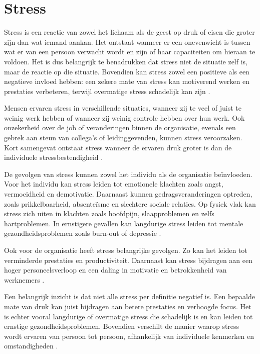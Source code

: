 \section{Stress}
\label{ch:stress} 
Stress is een reactie van zowel het lichaam als de geest op druk of eisen die groter zijn dan wat iemand aankan. Het ontstaat wanneer er een onevenwicht is tussen wat er van een persoon verwacht wordt en zijn of haar capaciteiten om hieraan te voldoen. Het is dus belangrijk te benadrukken dat stress niet de situatie zelf is, maar de reactie op die situatie. Bovendien kan stress zowel een positieve als een negatieve invloed hebben: een zekere mate van stress kan motiverend werken en prestaties verbeteren, terwijl overmatige stress schadelijk kan zijn \autocite{Stranks2005}.

Mensen ervaren stress in verschillende situaties, wanneer zij te veel of juist te weinig werk hebben of wanneer zij weinig controle hebben over hun werk. Ook onzekerheid over de job of veranderingen binnen de organisatie, evenals een gebrek aan steun van collega’s of leidinggevenden, kunnen stress veroorzaken. Kort samengevat ontstaat stress wanneer de ervaren druk groter is dan de individuele stressbestendigheid \autocite{Stranks2005}.

\vspace{1em}De gevolgen van stress kunnen zowel het individu als de organisatie beïnvloeden. Voor het individu kan stress leiden tot emotionele klachten zoals angst, vermoeidheid en demotivatie. Daarnaast kunnen gedragsveranderingen optreden, zoals prikkelbaarheid, absenteïsme en slechtere sociale relaties. Op fysiek vlak kan stress zich uiten in klachten zoals hoofdpijn, slaapproblemen en zelfs hartproblemen. In ernstigere gevallen kan langdurige stress leiden tot mentale gezondheidsproblemen zoals burn-out of depressie \autocite{Stranks2005}.

Ook voor de organisatie heeft stress belangrijke gevolgen. Zo kan het leiden tot verminderde prestaties en productiviteit. Daarnaast kan stress bijdragen aan een hoger personeelsverloop en een daling in motivatie en betrokkenheid van werknemers \autocite{Stranks2005}.

Een belangrijk inzicht is dat niet alle stress per definitie negatief is. Een bepaalde mate van druk kan juist bijdragen aan betere prestaties en verhoogde focus. Het is echter vooral langdurige of overmatige stress die schadelijk is en kan leiden tot ernstige gezondheidsproblemen. Bovendien verschilt de manier waarop stress wordt ervaren van persoon tot persoon, afhankelijk van individuele kenmerken en omstandigheden \autocite{Stranks2005}.

